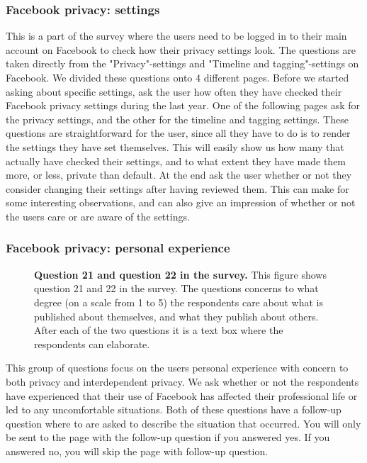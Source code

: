 \subsubsection{Facebook privacy: settings}
This is a part of the survey where the users need to be logged in to their main account on Facebook to check how their privacy settings look. The questions are taken directly from the "Privacy"-settings and "Timeline and tagging"-settings on Facebook. We divided these questions onto 4 different pages. Before we started asking about specific settings, ask the user how often they have checked their Facebook privacy settings during the last year.  One of the following pages ask for the privacy settings, and the other for the timeline and tagging settings. These questions are straightforward for the user, since all they have to do is to render the settings they have set themselves. This will easily show us how many that actually have checked their settings, and to what extent they have made them more, or less, private than default. At the end ask the user whether or not they consider changing their settings after having reviewed them. This can make for some interesting observations, and can also give an impression of whether or not the users care or are aware of the settings. 

\subsubsection{Facebook privacy: personal experience}

\begin{figure}[h!]
\centering
{}
\caption[Question 21 and question 22 in the survey]{\textbf{Question 21 and question 22 in the survey.} This figure shows question 21 and 22 in the survey. The questions concerns to what degree (on a scale from 1 to 5) the respondents care about what is published about themselves, and what they publish about others. After each of the two questions it is a text box where the respondents can elaborate.} 
\label{fig:page12}
\end{figure}

This group of questions focus on the users personal experience with concern to both privacy and interdependent privacy. We ask whether or not the respondents have experienced that their use of Facebook has affected their professional life or led to any uncomfortable situations. Both of these questions have a follow-up question where to are asked to describe the situation that occurred. You will only be sent to the page with the follow-up question if you answered yes. If you answered no, you will skip the page with follow-up question. 


